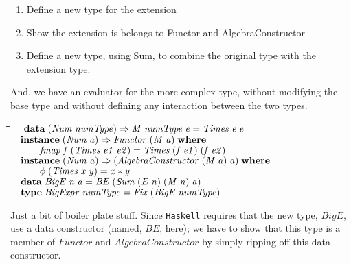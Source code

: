 \documentclass[10pt]{article}
\newlength{\lwidth}\setlength{\lwidth}{4.5cm}
\newlength{\cwidth}\setlength{\cwidth}{8mm} %
\newcommand{\Conid}[1]{\mathit{#1}}
\newcommand{\Varid}[1]{\mathit{#1}}
\begin{document}
\begin{enumerate}
  \parskip=0pt\itemsep=0pt
\item Define a new type for the extension
\item Show the extension is belongs to Functor and AlgebraConstructor
\item Define a new type, using Sum, to combine the original type with
  the extension type.
\end{enumerate}

And, we have an evaluator for the more complex type, without modifying
the base type and without defining any interaction between the two
types.

\begin{tabbing}
\qquad\=\hspace{\lwidth}\=\hspace{\cwidth}\=\+\kill
${\hskip1.00em\relax\mathbf{data}\;(\Conid{Num}\;\Varid{numType})\Rightarrow \Conid{M}\;\Varid{numType}\;\Varid{e}\mathrel{=}\Conid{Times}\;\Varid{e}\;\Varid{e}}$\\
${}$\\
${\hskip1.00em\relax\mathbf{instance}\;(\Conid{Num}\;\Varid{a})\Rightarrow \Conid{Functor}\;(\Conid{M}\;\Varid{a})\;\mathbf{where}}$\\
${\hskip1.00em\relax\hskip2.00em\relax\Varid{fmap}\;\Varid{f}\;(\Conid{Times}\;\Varid{e1}\;\Varid{e2})\mathrel{=}\Conid{Times}\;(\Varid{f}\;\Varid{e1})\;(\Varid{f}\;\Varid{e2})}$\\
${}$\\
${\hskip1.00em\relax\mathbf{instance}\;(\Conid{Num}\;\Varid{a})\Rightarrow (\Conid{AlgebraConstructor}\;(\Conid{M}\;\Varid{a})\;\Varid{a})\;\mathbf{where}}$\\
${\hskip1.00em\relax\hskip2.00em\relax\Varid{\phi}\;(\Conid{Times}\;\Varid{x}\;\Varid{y})\mathrel{=}\Varid{x}\mathbin{*}\Varid{y}}$\\
${}$\\
${\hskip1.00em\relax\mathbf{data}\;\Conid{BigE}\;\Varid{n}\;\Varid{a}\mathrel{=}\Conid{BE}\;(\Conid{Sum}\;(\Conid{E}\;\Varid{n})\;(\Conid{M}\;\Varid{n})\;\Varid{a})}$\\
${}$\\
${\hskip1.00em\relax\mathbf{type}\;\Conid{BigExpr}\;\Varid{numType}\mathrel{=}\Conid{Fix}\;(\Conid{BigE}\;\Varid{numType})}$
\end{tabbing}
Just a bit of boiler plate stuff.  Since \texttt{Haskell} requires
that the new type, \ensuremath{\Conid{BigE}}, use a data constructor (named, \ensuremath{\Conid{BE}}, here);
we have to show that this type is a member of \ensuremath{\Conid{Functor}} and
\ensuremath{\Conid{AlgebraConstructor}} by simply ripping off this data constructor.
\end{document}
